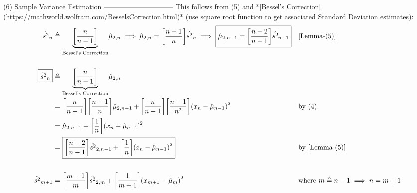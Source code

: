 (6) Sample Variance Estimation
------------------------------
This follows from (5) and *[Bessel's Correction](https://mathworld.wolfram.com/BesselsCorrection.html)* (use square root function to get associated Standard Deviation estimates):
\begin{align*}
  \hat{s^2}_n
    &\triangleq {\displaystyle\underbrace{\displaystyle{\left[\frac{n}{n-1}\right]}}_{\text{Bessel's Correction}}} \hat{\mu}_{2,n}
     \implies \hat{\mu}_{2,n}   = {\left[\frac{n-1}{n}\right]}\hat{s^2}_n
     \implies \boxed{\hat{\mu}_{2,n-1} = {\left[\frac{n-2}{n-1}\right]}\hat{s^2}_{n-1}}
    &&\text{[Lemma-(5)]}
    \\\\
  \boxed{\hat{s^2}_n}
    &\triangleq {\displaystyle\underbrace{\displaystyle{\left[\frac{n}{n-1}\right]}}_{\text{Bessel's Correction}}} \hat{\mu}_{2,n}
  \\&=  {\left[\frac{n}{n-1}\right]}{\left[\frac{n-1}{n}\right]}\hat{\mu}_{2,n-1} + {\left[\frac{n}{n-1}\right]}{\left[ \frac{n-1}{n^2} \right]} {\left( x_n - \hat{\mu}_{n-1} \right)}^2
    &&  \text{by (4)}
  \\&=  \hat{\mu}_{2,n-1} + {\left[ \frac{1}{n} \right]} {\left( x_n - \hat{\mu}_{n-1} \right)}^2
  \\&=  \boxed{{\left[\frac{n-2}{n-1}\right]}\hat{s^2}_{2,n-1} + {\left[ \frac{1}{n} \right]} {\left( x_n - \hat{\mu}_{n-1} \right)}^2}
    &&  \text{by [Lemma-(5)]}
    \\\\
  \hat{s^2}_{m+1}
    &=  {\left[\frac{m-1}{m}\right]}\hat{s^2}_{2,m} + {\left[ \frac{1}{m+1} \right]} {\left( x_{m+1} - \hat{\mu}_{m} \right)}^2
    && \text{where $m\triangleq n-1\implies n=m+1$}
\end{align*}
